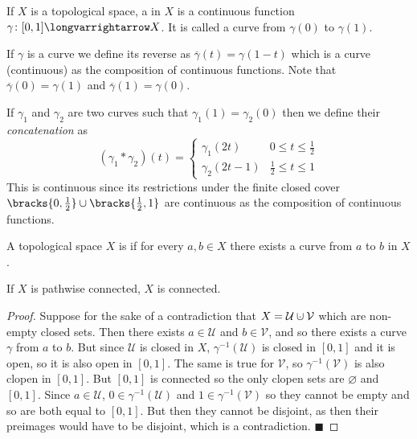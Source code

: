 \documentclass[10pt]{article}
\def\qed{\hskip1cm\penalty-100\hbox{}\hfill$\blacksquare$}
\def\mU{\mathcal{U}}
\def\mV{\mathcal{V}}
\def\longto{\longvarrightarrow}
\begin{document}


\bigskip

\begin{defn*}

    If $X$ is a topological space, a  in $X$ is a continuous function $\gamma\colon[0,1]\longto X$.
    It is called a curve from $\gamma(0)$ to $\gamma(1)$.

\end{defn*}

If $\gamma$ is a curve we define its reverse as $\overline\gamma(t)=\gamma(1-t)$ which is a curve (continuous) as the composition of continuous functions.
Note that $\overline\gamma(0)=\gamma(1)$ and $\overline\gamma(1)=\gamma(0)$.

If $\gamma_1$ and $\gamma_2$ are two curves such that $\gamma_1(1)=\gamma_2(0)$ then we define their \emph{concatenation} as
\[ (\gamma_1*\gamma_2)(t) = \begin{cases} \gamma_1(2t) & 0\leq t\leq\frac12 \\ \gamma_2(2t-1) & \frac12\leq t\leq1 \end{cases} \]
This is continuous since its restrictions under the finite closed cover $\bracks{0,\frac12}\cup\bracks{\frac12,1}$ are continuous as the composition of continuous functions.

\begin{defn*}

    A topological space $X$ is  if for every $a,b\in X$ there exists a curve from $a$ to $b$ in $X$.

\end{defn*}

\begin{prop*}

    If $X$ is pathwise connected, $X$ is connected.

\end{prop*}

\begin{proof}

    Suppose for the sake of a contradiction that $X=\mU\dcup\mV$ which are non-empty closed sets.
    Then there exists $a\in\mU$ and $b\in\mV$, and so there exists a curve $\gamma$ from $a$ to $b$.
    But since $\mU$ is closed in $X$, $\gamma^{-1}(\mU)$ is closed in $[0,1]$ and it is open, so it is also open in $[0,1]$.
    The same is true for $\mV$, so $\gamma^{-1}(\mV)$ is also clopen in $[0,1]$.
    But $[0,1]$ is connected so the only clopen sets are $\varnothing$ and $[0,1]$.
    Since $a\in\mU$, $0\in\gamma^{-1}(\mU)$ and $1\in\gamma^{-1}(\mV)$ so they cannot be empty and so are both equal to $[0,1]$.
    But then they cannot be disjoint, as then their preimages would have to be disjoint, which is a contradiction.
    \qed

\end{proof}
\end{document}
